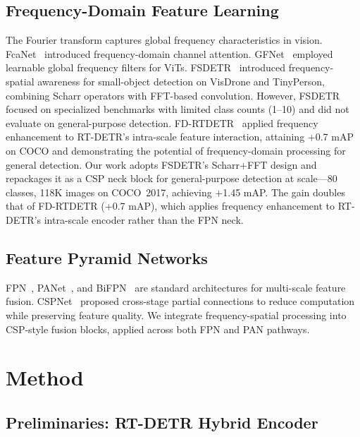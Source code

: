 \documentclass[10pt,twocolumn]{IEEEtran}
\begin{document}
\subsection{Frequency-Domain Feature Learning}

The Fourier transform captures global frequency characteristics in vision.
FcaNet~\cite{qin2021fcanet} introduced frequency-domain channel attention.
GFNet~\cite{rao2021global} employed learnable global frequency filters for ViTs.
FSDETR~\cite{fsdetr} introduced frequency-spatial awareness for small-object
detection on VisDrone and TinyPerson, combining Scharr operators with FFT-based
convolution. However, FSDETR focused on specialized benchmarks with
limited class counts (1--10) and did not evaluate on general-purpose
detection. FD-RTDETR~\cite{wang2025fdrtdetr} applied frequency enhancement to
RT-DETR's intra-scale feature interaction, attaining +0.7 mAP on COCO and
demonstrating the potential of frequency-domain processing for general detection.
Our work adopts FSDETR's Scharr+FFT design and repackages it as a CSP neck block
for general-purpose detection at scale---80 classes, 118K images on COCO~2017,
achieving +1.45 mAP. The gain doubles that of FD-RTDETR (+0.7 mAP),
which applies frequency enhancement to RT-DETR's intra-scale encoder rather than
the FPN neck.

\subsection{Feature Pyramid Networks}

FPN~\cite{lin2017fpn}, PANet~\cite{liu2018panet}, and BiFPN~\cite{tan2020efficientdet}
are standard architectures for multi-scale feature fusion. CSPNet~\cite{wang2020cspnet}
proposed cross-stage partial connections to reduce computation while preserving
feature quality.
We integrate frequency-spatial processing into CSP-style fusion blocks,
applied across both FPN and PAN pathways.

\section{Method}
\label{sec:method}

\subsection{Preliminaries: RT-DETR Hybrid Encoder}
\end{document}
